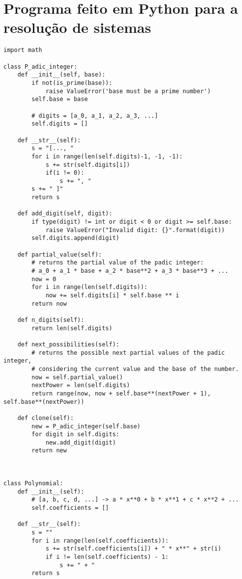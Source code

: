 \documentclass{report}
\begin{document}
\section*{Programa feito em Python para a resolução de sistemas}
\begin{verbatim}
import math

class P_adic_integer:
    def __init__(self, base):
        if not(is_prime(base)):
            raise ValueError('base must be a prime number')
        self.base = base

        # digits = [a_0, a_1, a_2, a_3, ...]
        self.digits = []

    def __str__(self):
        s = "[..., "
        for i in range(len(self.digits)-1, -1, -1):
            s += str(self.digits[i])
            if(i != 0):
                s += ", "
        s += " ]"
        return s

    def add_digit(self, digit):
        if type(digit) != int or digit < 0 or digit >= self.base:
            raise ValueError("Invalid digit: {}".format(digit))
        self.digits.append(digit)
    
    def partial_value(self):
        # returns the partial value of the padic integer:
        # a_0 + a_1 * base + a_2 * base**2 + a_3 * base**3 + ...
        now = 0
        for i in range(len(self.digits)):
            now += self.digits[i] * self.base ** i
        return now
    
    def n_digits(self):
        return len(self.digits)
    
    def next_possibilities(self):
        # returns the possible next partial values of the padic integer,
        # considering the current value and the base of the number.
        now = self.partial_value()
        nextPower = len(self.digits)
        return range(now, now + self.base**(nextPower + 1), self.base**(nextPower))
    
    def clone(self):
        new = P_adic_integer(self.base)
        for digit in self.digits:
            new.add_digit(digit)
        return new



class Polynomial:
    def __init__(self):
        # [a, b, c, d, ...] -> a * x**0 + b * x**1 + c * x**2 + ...
        self.coefficients = []
    
    def __str__(self):
        s = ""
        for i in range(len(self.coefficients)):
            s += str(self.coefficients[i]) + " * x**" + str(i)
            if i != len(self.coefficients) - 1:
                s += " + "
        return s
    

\end{verbatim}
\end{document}
